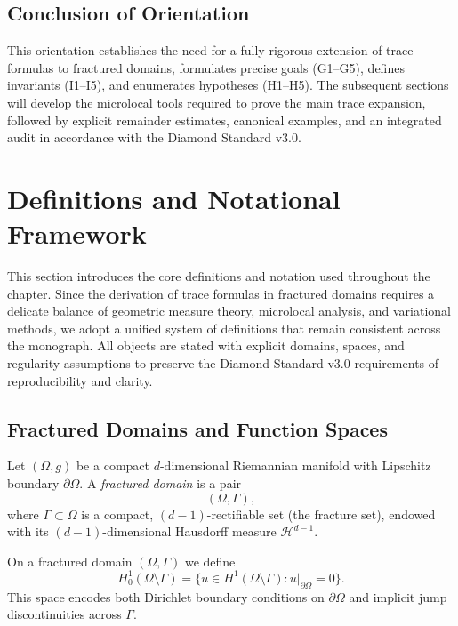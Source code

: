 \subsection*{Conclusion of Orientation}

This orientation establishes the need for a fully rigorous extension of trace
formulas to fractured domains, formulates precise goals (G1–G5), defines
invariants (I1–I5), and enumerates hypotheses (H1–H5). The subsequent sections
will develop the microlocal tools required to prove the main trace expansion,
followed by explicit remainder estimates, canonical examples, and an integrated
audit in accordance with the Diamond Standard v3.0.

\section{Definitions and Notational Framework}
\label{sec:trace-definitions}

This section introduces the core definitions and notation used throughout
the chapter. Since the derivation of trace formulas in fractured domains
requires a delicate balance of geometric measure theory, microlocal analysis,
and variational methods, we adopt a unified system of definitions that remain
consistent across the monograph. All objects are stated with explicit domains,
spaces, and regularity assumptions to preserve the Diamond Standard v3.0
requirements of reproducibility and clarity.

\subsection{Fractured Domains and Function Spaces}

\begin{definition}
Let $(\Omega,g)$ be a compact $d$-dimensional Riemannian manifold with Lipschitz boundary $\partial \Omega$. A \emph{fractured domain} is a pair
\[
(\Omega, \Gamma),
\]
where $\Gamma \subset \Omega$ is a compact, $(d-1)$-rectifiable set (the fracture set), endowed with its $(d-1)$-dimensional Hausdorff measure $\mathcal{H}^{d-1}$. 
\end{definition}

\begin{definition}
On a fractured domain $(\Omega,\Gamma)$ we define
\[
H^1_0(\Omega \setminus \Gamma) = \{ u \in H^1(\Omega \setminus \Gamma): u|_{\partial\Omega} = 0\}.
\]
This space encodes both Dirichlet boundary conditions on $\partial\Omega$ and implicit jump discontinuities across $\Gamma$.
\end{definition}

